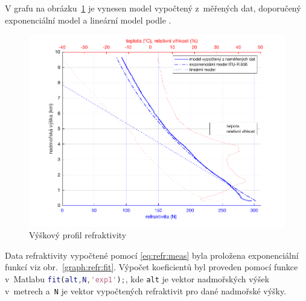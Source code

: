 \documentclass[twoside]{ctuthesis}
\theoremstyle{plain}
\theoremstyle{definition}
\theoremstyle{note}
\begin{document}
	V grafu na obrázku~\ref{graph:refr} je vynesen model vypočtený z~měřených dat, doporučený exponenciální model a lineární model podle \cite{zaklady:sireni:vln}.
	\begin{figure}[hbtp]
		\centering
		\includegraphics[width=.8\textwidth]{Graphs/refractivity_exp_lin_meas_hum.pdf}
		\caption{Výškový profil refraktivity}
		\label{graph:refr}
	\end{figure}

	Data refraktivity vypočtené pomocí \eqref{eq:refr:meas} byla proložena exponenciální funkcí viz obr.~\ref{graph:refr:fit}. Výpočet koeficientů byl proveden pomocí funkce v~Matlabu \lstinline[language=Matlab]|fit(alt,N,'exp1');|, kde \lstinline|alt| je vektor nadmořských výšek v~metrech a~\lstinline|N| je vektor vypočtených refraktivit pro dané nadmořské výšky.
\end{document}
